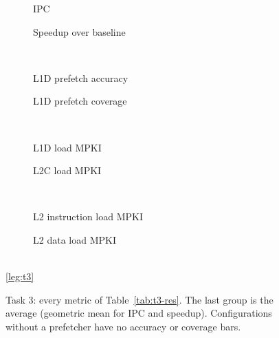 \begin{figure}[H]
\centering
\begin{subfigure}{0.49\textwidth}\centering
  \caption{IPC}
\end{subfigure}\hfill
\begin{subfigure}{0.49\textwidth}\centering
  \caption{Speedup over baseline}
\end{subfigure}\\[4pt]
\begin{subfigure}{0.49\textwidth}\centering
  \caption{L1D prefetch accuracy}
\end{subfigure}\hfill
\begin{subfigure}{0.49\textwidth}\centering
  \caption{L1D prefetch coverage}
\end{subfigure}\\[4pt]
\begin{subfigure}{0.49\textwidth}\centering
  \caption{L1D load MPKI}
\end{subfigure}\hfill
\begin{subfigure}{0.49\textwidth}\centering
  \caption{L2C load MPKI}
\end{subfigure}\\[4pt]
\begin{subfigure}{0.49\textwidth}\centering
  \caption{L2 instruction load MPKI}
\end{subfigure}\hfill
\begin{subfigure}{0.49\textwidth}\centering
  \caption{L2 data load MPKI}
\end{subfigure}\\[3pt]
\ref*{leg:t3}
\caption{Task 3: every metric of Table~\ref{tab:t3-res}. The last group is the average (geometric mean for IPC and
speedup). Configurations without a prefetcher have no accuracy or coverage bars.}
\label{fig:t3-res}
\end{figure}


